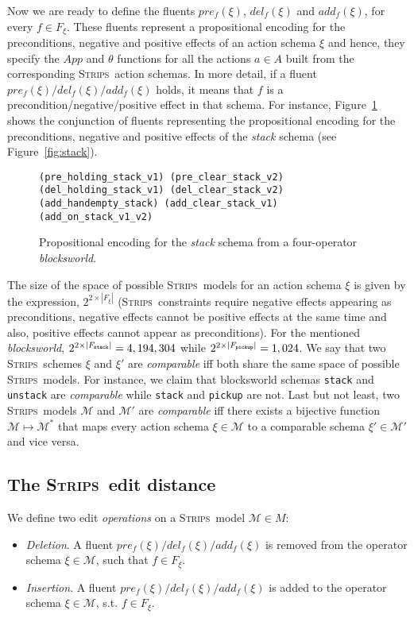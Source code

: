 \documentclass[letterpaper]{article} %
\newcommand{\strips}{\textsc{Strips}}     %
\begin{document}
Now we are ready to define the fluents $pre_f(\xi)$, $del_f(\xi)$ and $add_f(\xi)$, for every $f\in F_{\xi}$. These fluents represent a propositional encoding for the preconditions, negative and positive effects of an action schema $\xi$ and hence, they specify the $App$ and $\theta$ functions for all the actions $a\in A$ built from the corresponding \strips\ action schemas. In more detail, if a fluent $pre_f(\xi)/del_f(\xi)/add_f(\xi)$ holds, it means that $f$ is a precondition/negative/positive effect in that schema. For instance, Figure~\ref{fig:encodedstack} shows the conjunction of fluents representing the propositional encoding for the preconditions, negative and positive effects of the {\em stack} schema (see Figure~\ref{fig:stack}). 

\begin{figure}
\begin{scriptsize}
\begin{verbatim}
(pre_holding_stack_v1) (pre_clear_stack_v2)
(del_holding_stack_v1) (del_clear_stack_v2)
(add_handempty_stack) (add_clear_stack_v1) 
(add_on_stack_v1_v2)
\end{verbatim}
\end{scriptsize}
 \caption{\small Propositional encoding for the {\em stack} schema from a four-operator {\em blocksworld}.}
\label{fig:encodedstack}
\end{figure}

The size of the space of possible \strips\ models for an action schema $\xi$ is given by the expression, $2^{2\times|F_{\xi}|}$ (\strips\ constraints require negative effects appearing as preconditions, negative effects cannot be positive effects at the same time and also, positive effects cannot appear as preconditions). For the mentioned {\em blocksworld}, $2^{2\times|F_{\tt stack}|}=4,194,304$ while $2^{2\times|F_{\tt pickup}|}=1,024$. We say that two \strips\ schemes $\xi$ and $\xi'$ are {\em comparable} iff both share the same space of possible \strips\ models. For instance, we claim that blocksworld schemas {\small\tt stack} and {\small\tt unstack} are {\em comparable} while  {\small\tt stack} and {\small\tt pickup} are not. Last but not least, two \strips\ models $\mathcal{M}$ and $\mathcal{M}'$ are {\em comparable} iff there exists a bijective function $\mathcal{M} \mapsto \mathcal{M}^*$ that maps every action schema $\xi\in\mathcal{M}$ to a comparable schema $\xi'\in\mathcal{M'}$ and vice versa.


\subsection{The \strips\ edit distance}
We define two edit \emph{operations} on a \strips\ model $\mathcal{M}\in M$:
\begin{itemize}
\item {\em Deletion}. A fluent $pre_f(\xi)/del_f(\xi)/add_f(\xi)$ is removed from the operator schema $\xi\in\mathcal{M}$, such that $f\in F_{\xi}$.
\item {\em Insertion}. A fluent $pre_f(\xi)/del_f(\xi)/add_f(\xi)$ is added to the operator schema $\xi\in\mathcal{M}$, s.t. $f\in F_{\xi}$.
\end{itemize}
\end{document}
